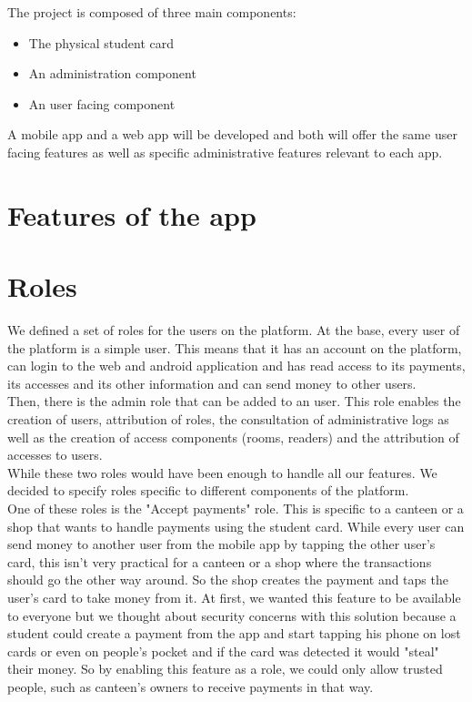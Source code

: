 \documentclass[11pt,a4paper]{report}
\begin{document}
The project is composed of three main components:
\begin{itemize}
    \item The physical student card
    \item An administration component
    \item An user facing component
\end{itemize}

A mobile app and a web app will be developed and both will offer the same user facing features as well as specific administrative features relevant to each app.

\section{Features of the app}



\section{Roles}
We defined a set of roles for the users on the platform. At the base, every user of the platform is a simple user. This means that it has an account on the platform, can login to the web and android application and has read access to its payments, its accesses and its other information and can send money to other users.\\

Then, there is the admin role that can be added to an user. This role enables the creation of users, attribution of roles, the consultation of administrative logs as well as the creation of access components (rooms, readers) and the attribution of accesses to users.\\

While these two roles would have been enough to handle all our features. We decided to specify roles specific to different components of the platform.\\

One of these roles is the "Accept payments" role. This is specific to a canteen or a shop that wants to handle payments using the student card. While every user can send money to another user from the mobile app by tapping the other user's card, this isn't very practical for a canteen or a shop where the transactions should go the other way around. So the shop creates the payment and taps the user's card to take money from it. At first, we wanted this feature to be available to everyone but we thought about security concerns with this solution because a student could create a payment from the app and start tapping his phone on lost cards or even on people's pocket and if the card was detected it would "steal" their money. So by enabling this feature as a role, we could only allow trusted people, such as canteen's owners to receive payments in that way. \\
\end{document}

